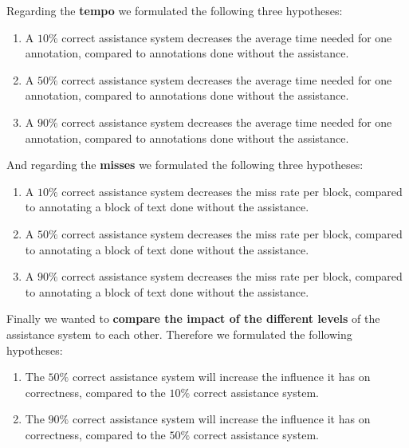 		\pagebreak

		Regarding the \textbf{tempo} we formulated the following three hypotheses:

		\begin{enumerate}[{B}i)]
			\item A \(10\%\) correct assistance system decreases the average time needed for one annotation, compared to annotations done without the assistance.
			\item A \(50\%\) correct assistance system decreases the average time needed for one annotation, compared to annotations done without the assistance.
			\item A \(90\%\) correct assistance system decreases the average time needed for one annotation, compared to annotations done without the assistance.
		\end{enumerate}
		\vspace{0.5cm}

		And regarding the \textbf{misses} we formulated the following three hypotheses:

		\begin{enumerate}[{C}i)]
			\item A \(10\%\) correct assistance system decreases the miss rate per block, compared to annotating a block of text done without the assistance.
			\item A \(50\%\) correct assistance system decreases the miss rate per block, compared to annotating a block of text done without the assistance.
			\item A \(90\%\) correct assistance system decreases the miss rate per block, compared to annotating a block of text done without the assistance.
		\end{enumerate}
		\vspace{0.5cm}

		Finally we wanted to \textbf{compare the impact of the different levels} of the assistance system to each other. Therefore we formulated the following hypotheses:

		\begin{enumerate}[{D}i)]
			\item The \(50\%\) correct assistance system will increase the influence it has on correctness, compared to the \(10\%\) correct assistance system.
			\item The \(90\%\) correct assistance system will increase the influence it has on correctness, compared to the \(50\%\) correct assistance system.
		\end{enumerate}
		\vspace{0.5cm}

